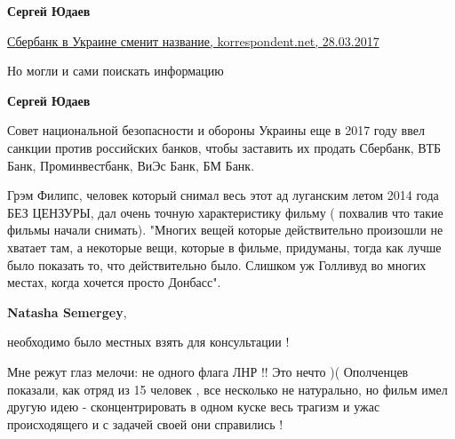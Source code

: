 \begin{itemize}
\begin{itemize}
 
\textbf{Сергей Юдаев}

\href{https://korrespondent.net/business/companies/3833053-sberbank-v-ukrayne-smenyt-nazvanye}{%
Сбербанк в Украине сменит название, korrespondent.net, 28.03.2017%
}

Но могли и сами поискать информацию

 
\textbf{Сергей Юдаев} 

Совет национальной безопасности и обороны Украины еще в 2017 году ввел санкции
против российских банков, чтобы заставить их продать Сбербанк, ВТБ Банк,
Проминвестбанк, ВиЭс Банк, БМ Банк.
\end{itemize}


Грэм Филипс, человек который снимал весь этот ад луганским летом 2014 года БЕЗ
ЦЕНЗУРЫ, дал очень точную характеристику фильму ( похвалив что такие фильмы
начали снимать). "Многих вещей которые действительно произошли не хватает там,
а некоторые вещи, которые в фильме, придуманы, тогда как лучше было показать
то, что действительно было. Слишком уж Голливуд во многих местах, когда хочется
просто Донбасс".

\begin{itemize}
 
\textbf{Natasha Semergey}, 

необходимо было местных взять для консультации !

Мне режут глаз мелочи: не одного флага ЛНР !! Это нечто )( Ополченцев
показали, как отряд из 15 человек , все несколько не натурально, но фильм имел
другую идею - сконцентрировать в одном куске весь трагизм и ужас происходящего
и с задачей своей они справились !
\end{itemize}


\end{itemize}
